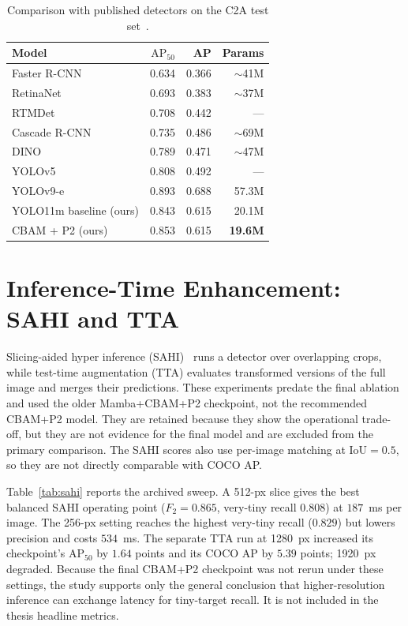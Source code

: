 \documentclass[12pt,a4paper,oneside]{report}
\begin{document}
\begin{table}[tbp]
  \centering
  \caption{Comparison with published detectors on the C2A test set~\cite{nihal2024c2a}.}
  \label{tab:sota}
  \begin{tabular}{|l|r|r|r|}
    \hline
    Model & $\mathrm{AP}_{50}$ & AP & Params \\
    \hline
    Faster R-CNN            & 0.634 & 0.366 & $\sim$41M \\ \hline
    RetinaNet               & 0.693 & 0.383 & $\sim$37M \\ \hline
    RTMDet                  & 0.708 & 0.442 & --- \\ \hline
    Cascade R-CNN           & 0.735 & 0.486 & $\sim$69M \\ \hline
    DINO                    & 0.789 & 0.471 & $\sim$47M \\ \hline
    YOLOv5                  & 0.808 & 0.492 & --- \\ \hline
    YOLOv9-e                & 0.893 & 0.688 & 57.3M \\
    \hline
    YOLO11m baseline (ours) & 0.843 & 0.615 & 20.1M \\ \hline
    CBAM + P2 (ours)        & 0.853 & 0.615 & \textbf{19.6M} \\
    \hline
  \end{tabular}
\end{table}

\section{Inference-Time Enhancement: SAHI and TTA}
\label{sec:sahitta}
Slicing-aided hyper inference (SAHI)~\cite{akyon2022sahi} runs a detector over
overlapping crops, while test-time augmentation (TTA) evaluates transformed
versions of the full image and merges their predictions. These experiments
predate the final ablation and used the older Mamba+CBAM+P2 checkpoint, not the
recommended CBAM+P2 model. They are retained because they show the operational
trade-off, but they are not evidence for the final model and are excluded from
the primary comparison. The SAHI scores also use per-image matching at
$\mathrm{IoU}=0.5$, so they are not directly comparable with COCO AP.

Table~\ref{tab:sahi} reports the archived sweep. A 512-px slice gives the best
balanced SAHI operating point ($F_2=0.865$, very-tiny recall $0.808$) at
$187$~ms per image. The 256-px setting reaches the highest very-tiny recall
($0.829$) but lowers precision and costs $534$~ms. The separate TTA run at
1280~px increased its checkpoint's $\mathrm{AP}_{50}$ by $1.64$ points and
its COCO AP by $5.39$ points; 1920~px degraded. Because the final CBAM+P2
checkpoint was not rerun under these settings, the study supports only the
general conclusion that higher-resolution inference can exchange latency for
tiny-target recall. It is not included in the thesis headline metrics.
\end{document}
